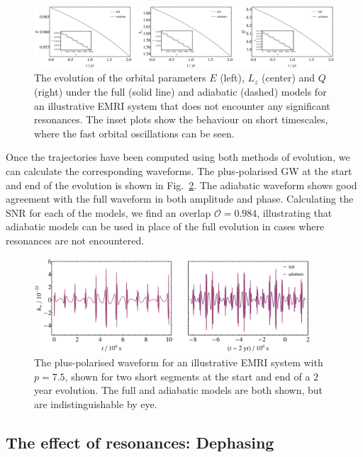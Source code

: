 \documentclass[aps,prd,amsfonts,amssymb,amsmath,nofootinbib,reprint,showpacs,superscriptaddress,twocolumn]{revtex4}
\newcommand{\figref}[1]{Fig.\ \ref{fig:#1}}
\begin{document}
\begin{figure}[htbp]
\centering
\includegraphics[width=\textwidth]{Fig_good_traj}
\caption{\label{fig:good-traj}The evolution of the orbital parameters $E$ (left), $L_z$ (center) and $Q$ (right) under the full (solid line) and adiabatic (dashed) models for an illustrative EMRI system that does not encounter any significant resonances. The inset plots show the behaviour on short timescales, where the fast orbital oscillations can be seen.}
\end{figure}

Once the trajectories have been computed using both methods of evolution, we can calculate the corresponding waveforms. The plus-polarised GW at the start and end of the evolution is shown in \figref{good-waveform}. The adiabatic waveform shows good agreement with the full waveform in both amplitude and phase. Calculating the SNR for each of the models, we find an overlap $\mathcal{O} = 0.984$, illustrating that adiabatic models can be used in place of the full evolution in cases where resonances are not encountered.

\begin{figure}[htbp]
\centering
\includegraphics[width=0.92\textwidth]{Fig_good_waveform}
\caption{\label{fig:good-waveform}The plus-polarised waveform for an illustrative EMRI system with $p=7.5$, shown for two short segments at the start and end of a $2$ year evolution. The full and adiabatic models are both shown, but are indistinguishable by eye.}
\end{figure}

\subsection{The effect of resonances: Dephasing}
\end{document}
